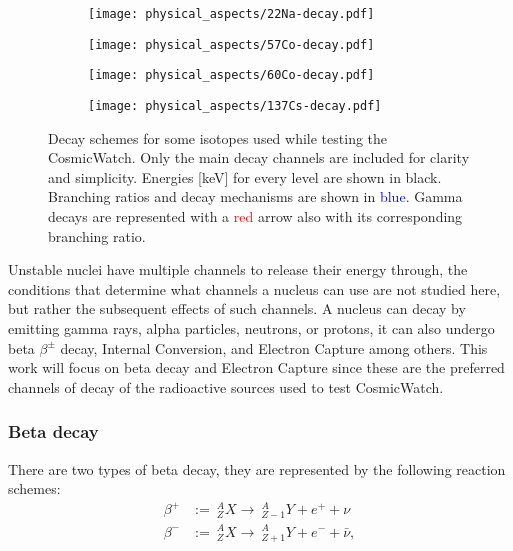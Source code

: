 \begin{figure}
  \centering
  \begin{subfigure}[t]{0.45\textwidth}
    \texttt{[image: physical\_aspects/22Na-decay.pdf]}
    \caption{\label{sfig:22Na}}
  \end{subfigure}
  \begin{subfigure}[t]{0.425\textwidth}
    \texttt{[image: physical\_aspects/57Co-decay.pdf]}
    \caption{\label{sfig:57Co}}
  \end{subfigure}
  \medskip
  \centering
  \begin{subfigure}[t]{0.425\textwidth}
    \texttt{[image: physical\_aspects/60Co-decay.pdf]}
    \caption{\label{sfig:60Co}}
  \end{subfigure}
  \begin{subfigure}[t]{0.425\textwidth}
    \texttt{[image: physical\_aspects/137Cs-decay.pdf]}
    \caption{\label{sfig:137Cs}}
  \end{subfigure}
  \caption{\label{fig:decay_schemes}Decay schemes for some isotopes used while testing the CosmicWatch. Only the main decay channels are included for clarity and simplicity. Energies [\unit{\kilo\eV}] for every level are shown in black. Branching ratios and decay mechanisms are shown in \textcolor{blue}{blue}. Gamma decays are represented with a \textcolor{red}{red} arrow also with its corresponding branching ratio.}
\end{figure}

Unstable nuclei have multiple channels to release their energy through, the conditions that determine what channels a nucleus can use are not studied here, but rather the subsequent effects of such channels. A nucleus can decay by emitting gamma rays, alpha particles, neutrons, or protons, it can also undergo beta $\beta^{\pm}$ decay, Internal Conversion, and Electron Capture among others. This work will focus on beta decay and Electron Capture since these are the preferred channels of decay of the radioactive sources used to test CosmicWatch.

\subsubsection{Beta decay} \label{sec:beta_decay}

There are two types of beta decay, they are represented by the following reaction schemes:
\begin{align}
  \beta^+ &:=~ ^A_ZX \rightarrow ~ ^A_{Z-1}Y + e^+ + \nu \\
  \beta^- &:=~ ^A_ZX \rightarrow ~ ^A_{Z+1}Y + e^- + \bar{\nu},
\end{align}

